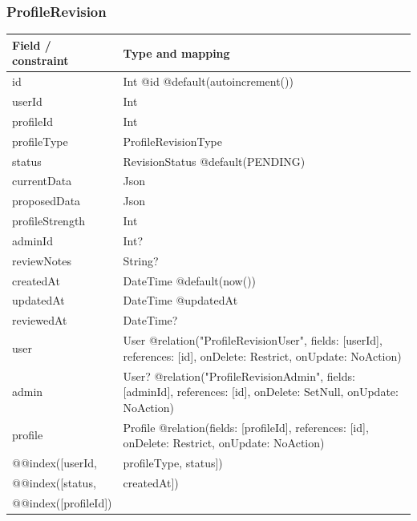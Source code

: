 \subsubsection{ProfileRevision}
\begin{longtable}{|L{3.3cm}|L{10.8cm}|}\hline
Field / constraint & Type and mapping \\ \hline
id & Int @id @default(autoincrement()) \\ \hline
userId & Int \\ \hline
profileId & Int \\ \hline
profileType & ProfileRevisionType \\ \hline
status & RevisionStatus @default(PENDING) \\ \hline
currentData & Json \\ \hline
proposedData & Json \\ \hline
profileStrength & Int \\ \hline
adminId & Int? \\ \hline
reviewNotes & String? \\ \hline
createdAt & DateTime @default(now()) \\ \hline
updatedAt & DateTime @updatedAt \\ \hline
reviewedAt & DateTime? \\ \hline
user & User @relation("ProfileRevisionUser", fields: [userId], references: [id], onDelete: Restrict, onUpdate: NoAction) \\ \hline
admin & User? @relation("ProfileRevisionAdmin", fields: [adminId], references: [id], onDelete: SetNull, onUpdate: NoAction) \\ \hline
profile & Profile @relation(fields: [profileId], references: [id], onDelete: Restrict, onUpdate: NoAction) \\ \hline
@@index([userId, & profileType, status]) \\ \hline
@@index([status, & createdAt]) \\ \hline
@@index([profileId]) &  \\ \hline
\end{longtable}
